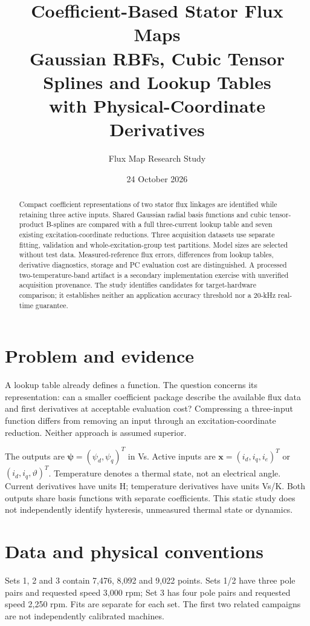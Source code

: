 \documentclass[11pt,a4paper]{article}
\title{\Large Coefficient-Based Stator Flux Maps\\Gaussian RBFs, Cubic Tensor Splines and Lookup Tables\\with Physical-Coordinate Derivatives}
\author{Flux Map Research Study}\date{24 October 2026}
\begin{document}
\maketitle
\begin{abstract}
Compact coefficient representations of two stator flux linkages are identified while retaining three active inputs. Shared Gaussian radial basis functions and cubic tensor-product B-splines are compared with a full three-current lookup table and seven existing excitation-coordinate reductions. Three acquisition datasets use separate fitting, validation and whole-excitation-group test partitions. Model sizes are selected without test data. Measured-reference flux errors, differences from lookup tables, derivative diagnostics, storage and PC evaluation cost are distinguished. A processed two-temperature-band artifact is a secondary implementation exercise with unverified acquisition provenance. The study identifies candidates for target-hardware comparison; it establishes neither an application accuracy threshold nor a 20-kHz real-time guarantee.
\end{abstract}
\section{Problem and evidence}
A lookup table already defines a function. The question concerns its representation: can a smaller coefficient package describe the available flux data and first derivatives at acceptable evaluation cost? Compressing a three-input function differs from removing an input through an excitation-coordinate reduction. Neither approach is assumed superior.

The outputs are $\bm\psi=(\psi_d,\psi_q)^T$ in Vs. Active inputs are $\bm x=(i_d,i_q,i_e)^T$ or $(i_d,i_q,\vartheta)^T$. Temperature denotes a thermal state, not an electrical angle. Current derivatives have units H; temperature derivatives have units Vs/K. Both outputs share basis functions with separate coefficients. This static study does not independently identify hysteresis, unmeasured thermal state or dynamics.

\section{Data and physical conventions}
Sets 1, 2 and 3 contain 7,476, 8,092 and 9,022 points. Sets 1/2 have three pole pairs and requested speed 3,000 rpm; Set 3 has four pole pairs and requested speed 2,250 rpm. Fits are separate for each set. The first two related campaigns are not independently calibrated machines.
\end{document}
